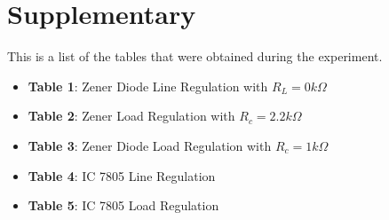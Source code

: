 \documentclass{scrartcl}
\newcommand{\1}{\mathbbm{1}}
\begin{document}
\section{Supplementary}
This is a list of the tables that were obtained during the experiment.
\begin{itemize}
	\item \textbf{Table 1}: Zener Diode Line Regulation with $R_L = 0 k\Omega$
	\item \textbf{Table 2}: Zener Load Regulation with $R_c = 2.2 k\Omega$
	\item \textbf{Table 3}: Zener Diode Load Regulation with $R_c = 1 k\Omega$
	\item \textbf{Table 4}: IC 7805 Line Regulation
	\item \textbf{Table 5}: IC 7805 Load Regulation
\end{itemize}
\end{document}
